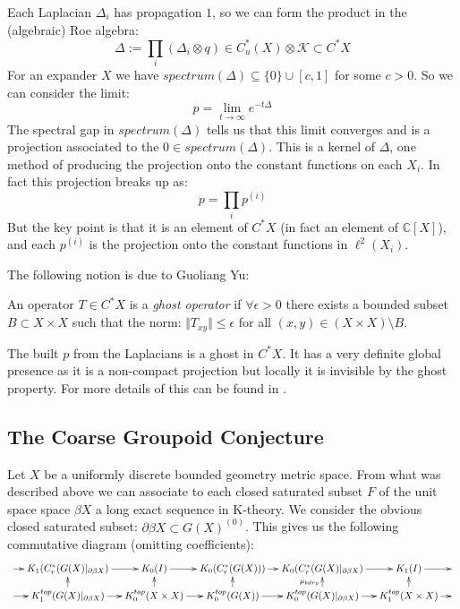 \begin{remark}\label{Rem:Ghost}
Each Laplacian $\Delta_{i}$ has propagation $1$, so we can form the product in the (algebraic) Roe algebra:
\begin{equation*}
\Delta:=\prod_{i}(\Delta_{i} \otimes q) \in C^{*}_{u}(X)\otimes \mathcal{K} \subset C^{*}X
\end{equation*}
For an expander $X$ we have $spectrum(\Delta) \subseteq \lbrace 0 \rbrace \cup [c,1]$ for some $c>0$. So we can consider the limit:
\begin{equation*}
p = \lim_{t \rightarrow \infty}e^{-t\Delta}
\end{equation*}
The spectral gap in $spectrum(\Delta)$ tells us that this limit converges and is a projection associated to the $0 \in spectrum(\Delta)$. This is a kernel of $\Delta$, one method of producing the projection onto the constant functions on each $X_{i}$. In fact this projection breaks up as:
\begin{equation*}
p=\prod_{i}p^{(i)}
\end{equation*}
But the key point is that it is an element of $C^{*}X$ (in fact an element of $\mathbb{C}[X]$), and each $p^{(i)}$ is the projection onto the constant functions in $\ell^{2}(X_{i})$. 

The following notion is due to Guoliang Yu:

\begin{definition}
An operator $T \in C^{*}X$ is a \textit{ghost operator} if $\forall \epsilon >0$ there exists a bounded subset $B \subset X\times X$ such that the norm: $\Vert T_{xy} \Vert \leq \epsilon$ for all $(x,y) \in (X\times X) \setminus B$.
\end{definition}

The built $p$ from the Laplacians is a ghost in $C^{*}X$. It has a very definite global presence as it is a non-compact projection but locally it is invisible by the ghost property. For more details of this can be found in \cite[Section 5]{explg1}.
\end{remark}

\subsection{The Coarse Groupoid Conjecture}
Let $X$ be a uniformly discrete bounded geometry metric space. From what was described above we can associate to each closed saturated subset $F$ of the unit space space $\beta X$ a long exact sequence in K-theory. We consider the obvious closed saturated subset: $\partial \beta X \subset G(X)^{(0)}$. This gives us the following commutative diagram (omitting coefficients):
\begin{equation*}
\xymatrix@=1em{
\ar[r] & K_{1}(C^{*}_{r}(G(X)|_{\partial\beta X}) \ar[r] & K_{0}(I) \ar[r]& K_{0}(C^{*}_{r}(G(X))) \ar[r]& K_{0}(C^{*}_{r}(G(X)|_{\partial\beta X})\ar[r] & K_{1}(I)\ar[r] &  \\
\ar[r] & K_{1}^{top}(G(X)|_{\partial\beta X}) \ar[r] \ar[u]& K_{0}^{top}(X \times X) \ar[r]\ar[u]& K_{0}^{top}(G(X)) \ar[r]\ar[u]& K_{0}^{top}(G(X)|_{\partial\beta X}) \ar[r]\ar[u]^{\mu_{bdry}}& K_{1}^{top}(X \times X)\ar[u]\ar[r] &
}
\end{equation*}

